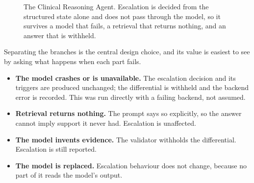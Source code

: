 \begin{figure}[H]
  \caption{The Clinical Reasoning Agent. Escalation is decided from the structured state
    alone and does not pass through the model, so it survives a model that fails, a
    retrieval that returns nothing, and an answer that is withheld.}
  \label{fig:pipeline}
\end{figure}

Separating the branches is the central design choice, and its value is easiest to see by
asking what happens when each part fails.

\begin{itemize}[nosep, leftmargin=*]
  \item \textbf{The model crashes or is unavailable.} The escalation decision and its
        triggers are produced unchanged; the differential is withheld and the backend error
        is recorded. This was run directly with a failing backend, not assumed.
  \item \textbf{Retrieval returns nothing.} The prompt says so explicitly, so the answer
        cannot imply support it never had. Escalation is unaffected.
  \item \textbf{The model invents evidence.} The validator withholds the differential.
        Escalation is still reported.
  \item \textbf{The model is replaced.} Escalation behaviour does not change, because no
        part of it reads the model's output.
\end{itemize}

